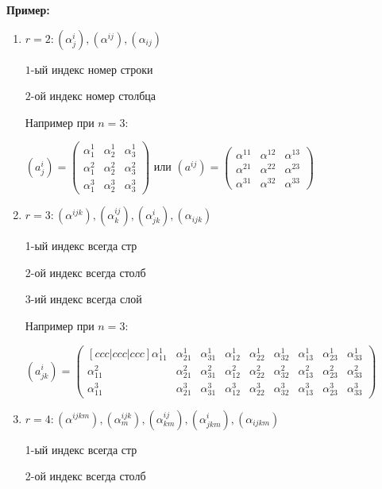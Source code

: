 \textbf{Пример:}
\begin{enumerate}
    

\item $r =2: (\alpha^i_j), (\alpha^{ij}),(\alpha_{ij})$

$1$-ый индекс номер строки

$2$-ой индекс номер столбца

Например при $n= 3$:

$(a^{i}_j) = \begin{pmatrix}
    \alpha^{1}_1 &\alpha^1_2 & \alpha_3^1\\
    \alpha_1^2 & \alpha_2^2 & \alpha_3^2 \\
    \alpha_1^3 & \alpha_2^3 & \alpha_3^3
\end{pmatrix}$ 
или 
$(a^{ij}) = \begin{pmatrix}
    \alpha^{11} &\alpha^{12} & \alpha^{13}\\
    \alpha^{21} & \alpha^{22} & \alpha^{23} \\
    \alpha^{31} & \alpha^{32} & \alpha^{33}
\end{pmatrix}$ 

\item $r=3: (\alpha^{ijk}), (\alpha^{ij}_k), (\alpha^{i}_{jk}), (\alpha_{ijk}) $

    1-ый индекс всегда стр

    2-ой индекс всегда столб

    3-ий индекс всегда слой

Например при $n=3$:

$(a^i_{jk}) = \begin{pmatrix}[ccc|ccc|ccc]
    \alpha^1_{11} &\alpha^1_{21} & \alpha^1_{31} & \alpha^1_{12} &\alpha^1_{22}&\alpha^1_{32} & \alpha^1_{13} & \alpha^1_{23} & \alpha^1_{33}\\
    \alpha^2_{11} &\alpha^2_{21} & \alpha^2_{31} & \alpha^2_{12} &\alpha^2_{22}&\alpha^2_{32} & \alpha^2_{13} & \alpha^2_{23} & \alpha^2_{33}\\
    \alpha^3_{11} &\alpha^3_{21} & \alpha^3_{31} & \alpha^3_{12} &\alpha^3_{22}&\alpha^3_{32} & \alpha^3_{13} & \alpha^3_{23} & \alpha^3_{33}
\end{pmatrix}$ 

\item $r=4: (\alpha^{ijkm}),(\alpha^{ijk}_{m}),(\alpha^{ij}_{km}), (\alpha^{i}_{jkm}), (\alpha_{ijkm})$

1-ый индекс всегда стр

2-ой индекс всегда столб


\end{enumerate}

